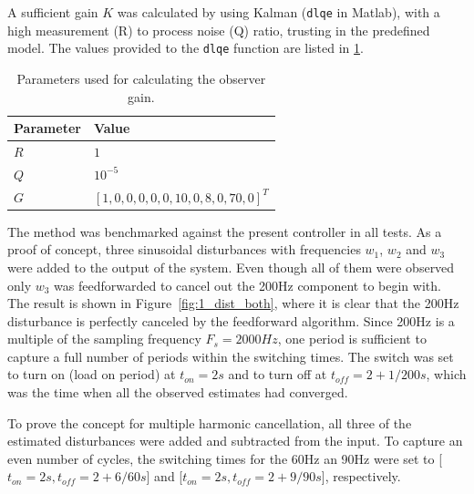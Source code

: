 A sufficient gain $K$ was calculated by using Kalman (\texttt{dlqe} in Matlab), with a high measurement (R) to process noise (Q) ratio, trusting in the predefined model. The values provided to the \texttt{dlqe} function are listed in \ref{tab:kalman}.

\begin{table}[h!]
  \centering
  \begin{tabular}{| l | l |}
    \hline
    Parameter & Value \\ \hline
    $R$ & $1$ \\
    $Q$ & $10^{-5}$ \\
    $G$ & $[1, 0, 0, 0, 0, 0, 10, 0, 8, 0, 70, 0]^T$ \\
    \hline
  \end{tabular}
  \caption{\label{tab:kalman} Parameters used for calculating the observer gain.}
\end{table}

The \abbrRFDC method was benchmarked against the present controller in all tests. As a proof of concept, three sinusoidal disturbances with frequencies $w_1$, $w_2$ and $w_3$ were added to the output of the system. Even though all of them were observed only $w_3$ was feedforwarded to cancel out the 200Hz component to begin with. The result is shown in Figure~\ref{fig:1_dist_both}, where it is clear that the 200Hz disturbance is perfectly canceled by the feedforward algorithm. Since 200Hz is a multiple of the sampling frequency $F_s = 2000Hz$, one period is sufficient to capture a full number of periods within the switching times. The switch was set to turn on (load on period) at $t_{on}=2s$ and to turn off at $t_{off}=2+1/200s$, which was the time when all the observed estimates had converged.

To prove the concept for multiple harmonic cancellation, all three of the estimated disturbances were added and subtracted from the input. To capture an even number of cycles, the switching times for the 60Hz an 90Hz were set to [$t_{on}=2s, t_{off}=2+6/60 s$] and [$t_{on}=2s, t_{off}=2+9/90 s$], respectively.

